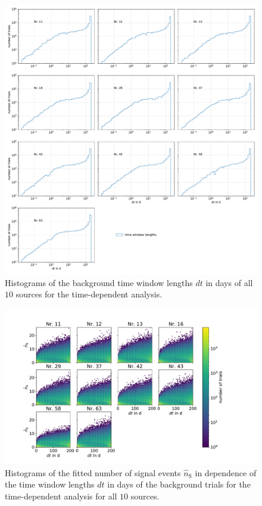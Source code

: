 \begin{figure}
    \centering
    \includegraphics[width=\linewidth]{Plots/05_csky/9_years_gfu_gold_time_dep_bg_dt.pdf}
    \caption{Histograms of the background time window lengths $dt$ in days of all $\num{10}$ sources for the time-dependent analysis.}
    \label{fig:bg_trials_time_dep_time_windows}
\end{figure}

\begin{figure}
    \centering
    \includegraphics[width=\linewidth]{Plots/05_csky/time_window_ns_bg_time_dep.pdf}
    \caption{Histograms of the fitted number of signal events $\hat{n}_\text{S}$ in dependence of the time window lengths $dt$ in days of the background trials for the time-dependent analysis for all $\num{10}$ sources.}
    \label{fig:bg_trials_time_dep_time_windows_ns}
\end{figure}

